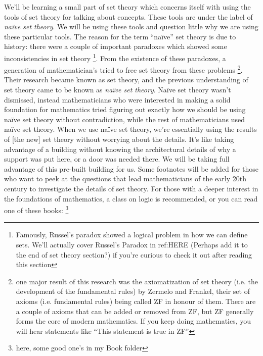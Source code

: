 \documentclass{book}
\begin{document}
We'll be learning a small part of set theory which concerns itself with using the tools of set theory for
talking about concepts. These tools are under the label of \emph{na\"ive set theory}. We will be using these
tools and question little why we are using these particular tools. The reason for the term ``na\"ive'' set
theory is due to history: there were a couple of important paradoxes which showed some inconsistencies in set
theory \footnote{Famously, Russel's paradox showed a logical problem in how we can define sets.  We'll
	actually cover Russel's Paradox in ref:HERE (Perhaps add it to the end of set theory section?) if you're
curious to check it out after reading this section}. From the existence of these paradoxes, a generation of
mathematician’s tried to free set theory from these problems \footnote{one major result of this research was
	the axiomatization  of set theory (i.e. the development of the fundamental rules) by Zermelo and Frankel,
	their set of axioms (i.e. fundamental rules) being called ZF in honour of them. There are a couple of
	axioms that can be added or removed from ZF, but ZF generally forms the core of modern mathematics. If you
keep doing mathematics, you will hear statements like ``This statement is true in ZF''}. Their research
became known as set theory, and the previous understanding of set theory came to be known as \emph{na\"ive
set theory}. Na\"ive set theory wasn't dismissed, instead mathematicians who were interested in making a
solid foundation for mathematics tried figuring out exactly how we should be using na\"ive set theory
without contradiction, while the rest of mathematicians used na\"ive set theory. When we use na\"ive set
theory, we're essentially using the results of [the new] set theory without worrying about the details.
It's like taking advantage of a building without knowing the architectural details of why a support was
put here, or a door was needed there. We will be taking full advantage of this pre-built building for us.
Some footnotes will be added for those who want to peek at the questions that lead mathematicians of the
early 20th century to investigate the details of set theory. For those with a deeper interest in the
foundations of mathematics, a class on logic is recommended, or you can read one of these books:
\footnote{here, some good one's in my Book folder}

\end{document}
